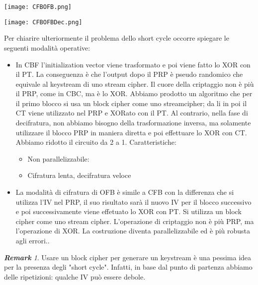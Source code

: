 \documentclass{article}
\theoremstyle{remark}
\newtheorem*{remark}{\textbf{Remark}}
\begin{document}
\begin{center}
	\texttt{[image: CFBOFB.png]}
\end{center}
\begin{center}
	\texttt{[image: CFBOFBDec.png]}
\end{center}
Per chiarire ulteriormente il problema dello short cycle occorre spiegare le seguenti modalità operative:
\begin{itemize}
	\item In CBF l'initialization vector viene trasformato e poi viene fatto lo XOR con il PT. La conseguenza è che l'output dopo il PRP è pseudo randomico che equivale al keystream di uno stream cipher. Il cuore della criptaggio non è più il PRP, come in CBC, ma è lo XOR. Abbiamo prodotto un algoritmo che per il primo blocco si usa un block cipher come uno streamcipher; da li in poi il CT viene utilizzato nel PRP e XORato con il PT. Al contrario, nella fase di decifratura, non abbiamo bisogno della trasformazione inversa, ma solamente utilizzare il blocco PRP in maniera diretta e poi effettuare lo XOR con CT. Abbiamo ridotto il circuito da 2 a 1. Caratteristiche:\begin{itemize}
		      \item Non parallelizzabile:
		      \item Cifratura lenta, decifratura veloce
	      \end{itemize}
	\item La modalità di cifratura di OFB è simile a CFB con la differenza che si utilizza l'IV nel PRP, il suo risultato sarà il nuovo IV per il blocco successivo e poi successivamente viene effetuato lo XOR con PT. Si utilizza un block cipher come uno stream cipher. L'operazione di criptaggio non è più PRP, ma l'operazione di XOR. La costruzione diventa parallelizzabile ed è più robusta agli errori..
\end{itemize}
\begin{remark}
	Usare un block cipher per generare un keystream è una pessima idea per la presenza degli "short cycle". Infatti, in base dal punto di partenza abbiamo delle ripetizioni: qualche IV può essere debole.
\end{remark}
\end{document}
